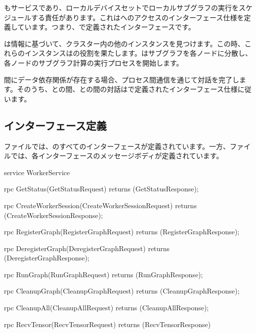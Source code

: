 \begin{content}

もサービスであり、ローカルデバイスセットでローカルサブグラフの実行をスケジュールする責任があります。これはへのアクセスのインターフェース仕様を定義しています。つまり、で定義されたインターフェースです。

は情報に基づいて、クラスター内の他のインスタンスを見つけます。この時、これらのインスタンスはの役割を果たします。はサブグラフを各ノードに分散し、各ノードのサブグラフ計算の実行プロセスを開始します。

間にデータ依存関係が存在する場合、プロセス間通信を通じて対話を完了します。そのうち、との間、との間の対話はで定義されたインターフェース仕様に従います。

\subsection{インターフェース定義}

ファイルでは、のすべてのインターフェースが定義されています。一方、ファイルでは、各インターフェースのメッセージボディが定義されています。

\begin{leftbar}
\begin{c++}
service WorkerService {
  rpc GetStatus(GetStatusRequest) 
      returns (GetStatusResponse);

  rpc CreateWorkerSession(CreateWorkerSessionRequest)
      returns (CreateWorkerSessionResponse);

  rpc RegisterGraph(RegisterGraphRequest) 
      returns (RegisterGraphResponse);

  rpc DeregisterGraph(DeregisterGraphRequest) 
      returns (DeregisterGraphResponse);

  rpc RunGraph(RunGraphRequest) 
      returns (RunGraphResponse);

  rpc CleanupGraph(CleanupGraphRequest) 
      returns (CleanupGraphResponse);

  rpc CleanupAll(CleanupAllRequest) 
      returns (CleanupAllResponse);

  rpc RecvTensor(RecvTensorRequest) 
      returns (RecvTensorResponse) {
  }

}
\end{c++}
\end{leftbar}
\end{content}
